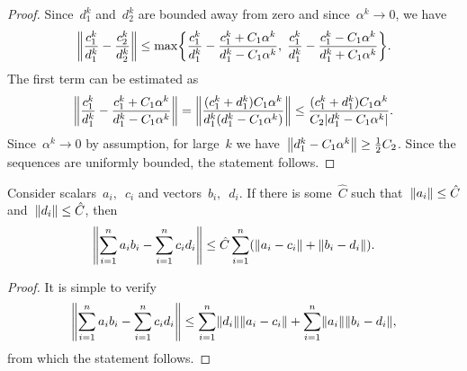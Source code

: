 \begin{proof}
  Since~$d_1^k$ and~$d_2^k$ are bounded away from zero and since~$\alpha^k \to 0$, we have
  \begin{equation*}
    \norm{\frac{c_1^k}{d_1^k} - \frac{c_2^k}{d_2^k}}
      \le \max\Brac[c]{\frac{c_1^k}{d_1^k} - \frac{c_1^k+C_1\alpha^k}{d_1^k-C_1\alpha^k}, \; \frac{c_1^k}{d_1^k} - \frac{c_1^k-C_1\alpha^k}{d_1^k+C_1\alpha^k}}.
  \end{equation*}
  The first term can be estimated as
  \begin{equation*}
    \norm{\frac{c_1^k}{d_1^k} - \frac{c_1^k+C_1\alpha^k}{d_1^k-C_1\alpha^k}}
    = \norm{\frac{(c_1^k+d_1^k)C_1\alpha^k}{d_1^k(d_1^k-C_1\alpha^k)}}
    \le \frac{(c_1^k+d_1^k)C_1\alpha^k}{C_2|d_1^k-C_1\alpha^k|}.
  \end{equation*}
  Since~$\alpha^k\to 0$ by assumption, for large~$k$ we have~$\norm{d_1^k-C_1\alpha^k}\ge \frac{1}{2}C_2$. Since the sequences are uniformly bounded, the statement follows.
\end{proof}

\pagebreak

\begin{lemma}\label{lemma:product}
  Consider scalars~$a_i,$~$c_i$ and vectors~$b_i,$~$d_i.$ If there is some~$\hat{C}$ such that~$\norm{a_i} \le \hat{C}$ and~$\norm{d_i} \le \hat{C}$, then
  \begin{equation*}
    \norm{\sum_{i=1}^n a_ib_i - \sum_{i=1}^n c_id_i}
      \le \hat{C}\sum_{i=1}^n \Brac{\norm{a_i-c_i} + \norm{b_i-d_i}}.
  \end{equation*}
\end{lemma}
\begin{proof}
  It is simple to verify
  \begin{equation*}
    \norm{\sum_{i=1}^n a_ib_i - \sum_{i=1}^n c_id_i} \le \sum_{i=1}^n \norm{d_i}\norm{a_i-c_i} + \sum_{i=1}^n \norm{a_i}\norm{b_i-d_i},
  \end{equation*}
  from which the statement follows.
\end{proof}